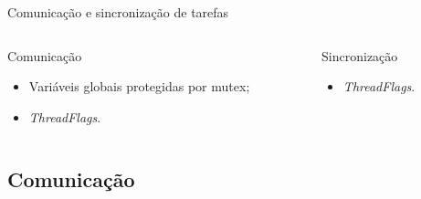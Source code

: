 \documentclass{if-beamer}
\begin{document}
\begin{frame}{Comunicação e sincronização de tarefas}
	
	\begin{columns}
		
		\begin{column}{0.5\textwidth}
			
			\begin{block}{Comunicação}
				
				\begin{itemize}
					\item Variáveis globais protegidas por mutex;
					\item \textit{ThreadFlags}.					
				\end{itemize}
				
			\end{block}
			
		\end{column}
		
		\begin{column}{0.5\textwidth}
			
			\begin{block}{Sincronização}
				
				\begin{itemize}
					\item \textit{ThreadFlags}.	
					
				\end{itemize}		
				
			\end{block}
			
		\end{column}
		
	\end{columns}
	
\end{frame}


\subsection*{Comunicação}
\end{document}
